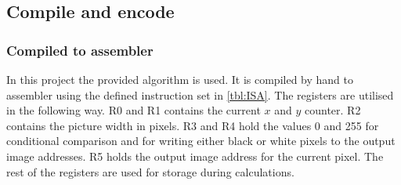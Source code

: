 \documentclass[a4paper, english]{article}
\numberwithin{equation}{section}
\begin{document}
\subsection{Compile and encode}\label{sec:compileandencode}
\subsubsection{Compiled to assembler}
In this project the provided algorithm is used. It is compiled by hand to assembler using the defined instruction set in \cref{tbl:ISA}. The registers are utilised in the following way. R0 and R1 contains the current \(x\) and \(y\) counter. R2 contains the picture width in pixels. R3 and R4 hold the values 0 and 255 for conditional comparison and for writing either black or white pixels to the output image addresses. R5 holds the output image address for the current pixel. The rest of the registers are used for storage during calculations.
\end{document}
